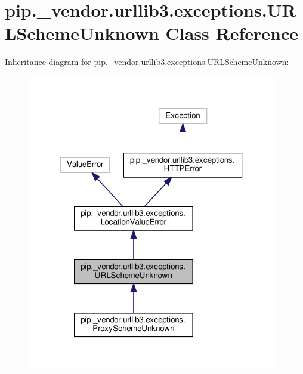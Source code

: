 \hypertarget{classpip_1_1__vendor_1_1urllib3_1_1exceptions_1_1URLSchemeUnknown}{}\section{pip.\+\_\+vendor.\+urllib3.\+exceptions.\+U\+R\+L\+Scheme\+Unknown Class Reference}
\label{classpip_1_1__vendor_1_1urllib3_1_1exceptions_1_1URLSchemeUnknown}


Inheritance diagram for pip.\+\_\+vendor.\+urllib3.\+exceptions.\+U\+R\+L\+Scheme\+Unknown\+:
\nopagebreak
\begin{figure}[H]
\begin{center}
\leavevmode
\includegraphics[width=309pt]{classpip_1_1__vendor_1_1urllib3_1_1exceptions_1_1URLSchemeUnknown__inherit__graph}
\end{center}
\end{figure}


